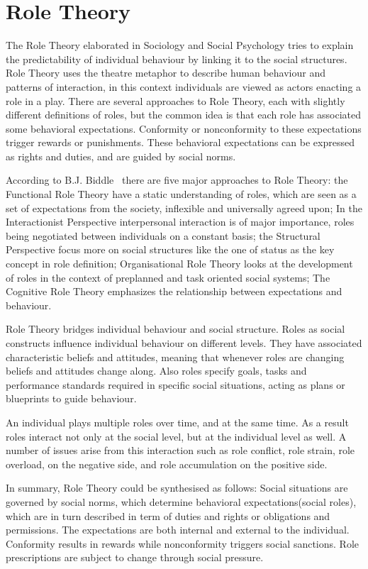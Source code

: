 \documentclass[a4paper,12pt,oneside,fleqn]{book} %
\begin{document}
\section{Role Theory} %

The Role Theory elaborated in Sociology and Social Psychology tries to
explain the predictability of individual behaviour by linking it to the
social structures. Role Theory uses the theatre metaphor to describe human
behaviour and patterns of interaction, in this context individuals are
viewed as actors enacting a role in a play. There are several approaches to
Role Theory, each with slightly different definitions of roles, but the
common idea is that each role has associated some behavioral expectations.
Conformity or nonconformity to these expectations trigger rewards or
punishments. These behavioral expectations can be expressed as rights and
duties, and are guided by social norms.

According to B.J. Biddle~\cite{biddle1986recent} there are five major
approaches to Role Theory: the Functional Role Theory have a static
understanding of roles, which are seen as a set of expectations from the
society, inflexible and universally agreed upon; In the Interactionist
Perspective interpersonal interaction is of major importance, roles being
negotiated between individuals on a constant basis; the Structural
Perspective focus more on social structures like the one of status as the
key concept in role definition; Organisational Role Theory looks at the
development of roles in the context of preplanned and task oriented social
systems; The Cognitive Role Theory emphasizes the relationship between
expectations and behaviour.

Role Theory bridges individual behaviour and social structure. Roles as
social constructs influence individual behaviour on different levels. They
have associated characteristic beliefs and attitudes, meaning that whenever
roles are changing beliefs and attitudes change along. Also roles specify
goals, tasks and performance standards required in specific social
situations, acting as plans or blueprints to guide behaviour.

An individual plays multiple roles over time, and at the same time. As a
result roles interact not only at the social level, but at the individual
level as well. A number of issues arise from this interaction such as role
conflict, role strain, role overload, on the negative side, and role
accumulation on the positive side.

In summary, Role Theory could be synthesised as follows: Social situations
are governed by social norms, which determine behavioral
expectations(social roles), which are in turn described in term of duties
and rights or obligations and permissions. The expectations are both
internal and external to the individual. Conformity results in rewards
while nonconformity triggers social sanctions. Role prescriptions are
subject to change through social pressure.
\end{document}
